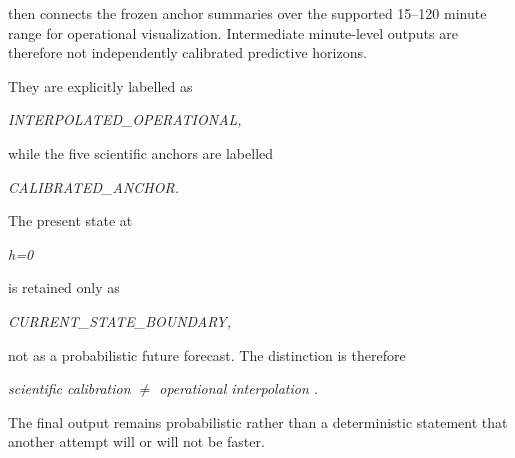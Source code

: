 then connects the frozen anchor summaries over the supported 15--120 minute range for operational visualization. Intermediate minute-level outputs are therefore not independently calibrated predictive horizons.

They are explicitly labelled as

\begin{center}\textit{INTERPOLATED\_OPERATIONAL,}\end{center}

while the five scientific anchors are labelled

\begin{center}\textit{CALIBRATED\_ANCHOR.}\end{center}

The present state at

\begin{center}\textit{h=0}\end{center}

is retained only as

\begin{center}\textit{CURRENT\_STATE\_BOUNDARY,}\end{center}

not as a probabilistic future forecast. The distinction is therefore

\begin{center}\textit{scientific calibration \ensuremath{\neq} operational interpolation .}\end{center}

The final output remains probabilistic rather than a deterministic statement that another attempt will or will not be faster.

